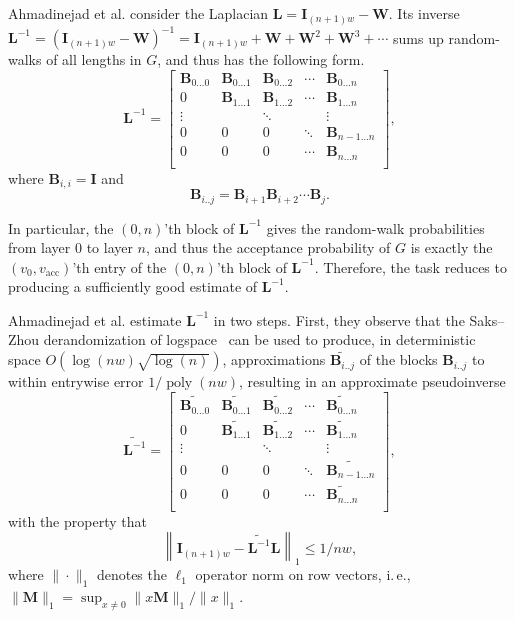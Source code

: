 \documentclass[11pt]{article}
\numberwithin{equation}{section}
\theoremstyle{definition}
\theoremstyle{plain}
\newcommand{\ie}{i.\,e.}
\newcommand{\mB}{\mathbf{B}}
\newcommand{\mW}{\mathbf{W}}
\newcommand{\mL}{\mathbf{L}}
\newcommand{\I}{\mathbf{I}}
\newcommand{\lbar}{\left\|}
\newcommand{\rbar}{\right\|}
\newcommand{\vac}{v_{\text{acc}}}
\newcommand{\poly}{\operatorname{poly}}
\newcommand{\Lt}{\widetilde{\mathbf{L}^{-1}}}
\begin{document}
%
Ahmadinejad  %
et al. consider the Laplacian $\mL = \I_{(n+1)w} - \mW$.  Its
   inverse $\mL^{-1} = (\I_{(n+1)w}-\mW)^{-1} = \I_{(n+1)w}+\mW+\mW^2+\mW^3+\cdots$ sums up random-walks of all lengths in $G$, and thus has the following form. %
   $$\mL^{-1} =
   \begin{bmatrix}
    \mB_{0\ldots0} & \mB_{0\ldots 1} & \mB_{0\ldots 2} & \cdots & \mB_{0\ldots n} \\
    0 & \mB_{1\ldots 1} & \mB_{1\ldots 2} & \cdots & \mB_{1\ldots n} \\
    \vdots & & \ddots & & \vdots\\
    0 & 0 & 0 & \ddots & \mB_{n-1\ldots n}\\
    0 & 0 & 0 & \cdots &  \mB_{n\ldots n} \\
    \end{bmatrix},$$
   where $\mB_{i,i}=\I$ and 
   $$\mB_{i .. j} = \mB_{i+1}\mB_{i+2}\cdots \mB_j.$$
   
   In particular, the $(0,n)$'th block of $\mL^{-1}$ gives the random-walk
   probabilities from layer $0$ to layer $n$, and thus the acceptance probability
   of $G$ is exactly the $(v_0,\vac)$'th entry of the $(0,n)$'th block of $\mL^{-1}$.  Therefore, the task reduces to producing a sufficiently good estimate of $\mL^{-1}$.
   
%
Ahmadinejad  %
et al. estimate $\mL^{-1}$  in two steps.  First, they observe that the Saks--Zhou derandomization of logspace~\cite{SaksZh99} can be used to produce,
   in deterministic space $O(\log(nw)\sqrt{\log(n)})$, %
   approximations %
   $\widetilde{\mB_{i .. j}}$ of the blocks $\mB_{i .. j}$ to within entrywise error $1/\poly(nw)$, resulting in an approximate pseudoinverse
   \begin{equation}
       \Lt =
   \begin{bmatrix}
    \widetilde{\mB_{0\ldots0}} & \widetilde{\mB_{0\ldots 1}} & \widetilde{\mB_{0\ldots 2}} & \cdots & \widetilde{\mB_{0\ldots n}} \\
    0 & \widetilde{\mB_{1\ldots 1}} & \widetilde{\mB_{1\ldots 2}} & \cdots & \widetilde{\mB_{1\ldots n}} \\
    \vdots & & \ddots & & \vdots\\
    0 & 0 & 0 & \ddots & \widetilde{\mB_{n-1\ldots n}}\\
    0 & 0 & 0 & \cdots &  \widetilde{\mB_{n\ldots n}} \\
    \end{bmatrix},\label{eqn:path-inverse}
   \end{equation}
   with the property that
   $$\lbar \I_{(n+1)w}-\Lt \mL\rbar_{1}\leq 1/nw,$$
   where $\|\cdot\|_1$ denotes the $\ell_1$ operator norm on row vectors, \ie, $\|\mathbf{M}\|_1 =\sup_{x\neq 0}\|x\mathbf{M}\|_{1}/\|x\|_{1}$.
\end{document}
